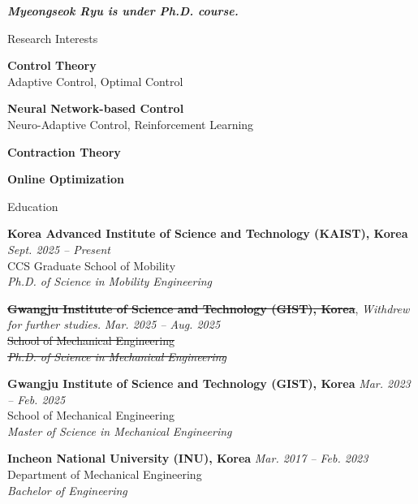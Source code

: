 \documentclass{resume} %
\begin{document}
{\centerline {\em \textbf { Myeongseok Ryu is under Ph.D. course.} } }

\begin{rSection}{Research Interests}

\small{
    {\bf Control Theory} 
    \\
    Adaptive Control, Optimal Control
    
    
    {\bf Neural Network-based Control} 
    \\
    Neuro-Adaptive Control, Reinforcement Learning
    
    
    {\bf Contraction Theory} 

    {\bf Online Optimization}
}

\end{rSection}

\begin{rSection}{Education}

\small{
    {\bf Korea Advanced Institute of Science and Technology (KAIST), Korea} 
        \hfill 
        {\em Sept. 2025 – Present} 
        \\
        CCS Graduate School of Mobility
        \\
        {\textit {Ph.D. of Science in Mobility Engineering}} 

    \sout{\bf{Gwangju Institute of Science and Technology (GIST)}, Korea}, \textit{Withdrew for further studies.}
        \hfill 
        {\em Mar. 2025 – Aug. 2025} 
        \\
        \sout{School of Mechanical Engineering}
        \\
        \sout{\textit {Ph.D. of Science in Mechanical Engineering}} 

    {\bf Gwangju Institute of Science and Technology (GIST), Korea} 
        \hfill 
        {\em Mar. 2023 – Feb. 2025} 
        \\
        School of Mechanical Engineering
        \\
        {\textit {Master of Science in Mechanical Engineering}} 

    {\bf Incheon National University (INU), Korea} 
        \hfill 
        {\em Mar. 2017 – Feb. 2023} 
        \\
        Department of Mechanical Engineering
        \\
        {\textit {Bachelor of Engineering}} 
}


\end{rSection}
\end{document}
